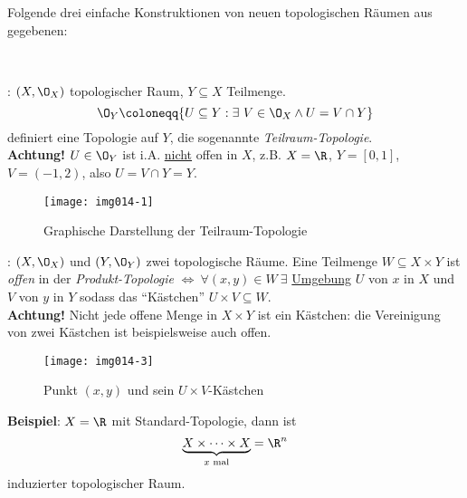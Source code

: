 \begin{remark}
  Folgende drei einfache Konstruktionen von neuen topologischen Räumen aus gegebenen:
  \begin{enumerate}
    \ \\
    \begin{minipage}{.45\textwidth}
      \item {}\label{def:teilraumtopologie}: $ (X, \O_X) $ topologischer Raum, $ Y \subseteq X $ Teilmenge.
        \begin{equation*}
          \O_Y \coloneqq \{ U \subseteq Y : \exists \ V \in \O_X \wedge U = V \cap Y \}
        \end{equation*}
        definiert eine Topologie auf $ Y $, die sogenannte \emph{Teilraum-Topologie}.\footnotemark \\
        \textbf{Achtung!} $ U \in \O_Y $ ist i.A. \underline{nicht} offen in $ X $, z.B. $ X = \R $, $ Y = [0,1] $, $ V = (-1, 2) $, also $ U = V \cap Y = Y $.
    \end{minipage}
    \hfill
    \begin{minipage}{.45\textwidth}
      \begin{figure}[H]
        \label{img014-1}
        \texttt{[image: img014-1]}
        \caption{Graphische Darstellung der Teilraum-Topologie}
      \end{figure}
    \end{minipage}

    \begin{minipage}{.45\textwidth}
      \item {}\label{def:produkttopologie}: $ (X, \O_X) $ und $ (Y, \O_Y) $ zwei topologische Räume. Eine Teilmenge $ W \subseteq X \times Y $ ist \emph{offen} in der \emph{Produkt-Topologie} $ \Leftrightarrow \ \forall (x, y) \in W \ \exists $ \hyperref[def:umgebung]{Umgebung} $ U $ von $ x $ in $ X $ und $ V $ von $ y $ in $ Y $ sodass das ``Kästchen'' $ U \times V \subseteq W $. \\
      \textbf{Achtung!} Nicht jede offene Menge in $ X \times Y $ ist ein Kästchen: die Vereinigung von zwei Kästchen ist beispielsweise auch offen.
    \end{minipage}
    \hfill
    \begin{minipage}{.45\textwidth}
      \begin{figure}[H]
        \label{img014-3}
        \texttt{[image: img014-3]}
        \caption{Punkt $ (x,y) $ und sein $ U \times V $-Kästchen}
      \end{figure}
    \end{minipage}
    \textbf{Beispiel}: $ X = \R $ mit Standard-Topologie, dann ist
    \begin{equation*}
      \underbrace{X \times \cdots \times X}_{x \text{ mal}} = \R^n
    \end{equation*}
    induzierter topologischer Raum.


\end{enumerate}
\end{remark}
